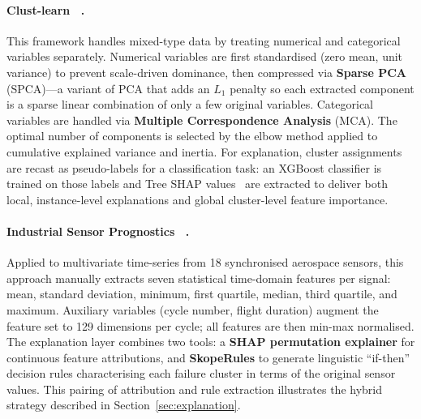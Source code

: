 \documentclass{article}
\theoremstyle{plain}
\theoremstyle{definition}
\theoremstyle{remark}
\begin{document}
\paragraph{Clust-learn ~\cite{alvarez-garcia_comprehensive_2024}.}
This framework handles mixed-type data by treating numerical and
categorical variables separately. Numerical variables are first
standardised (zero mean, unit variance) to prevent scale-driven
dominance, then compressed via \textbf{Sparse PCA} (SPCA)---a variant
of PCA that adds an $L_1$ penalty so each extracted component is a
sparse linear combination of only a few original variables. Categorical
variables are handled via \textbf{Multiple Correspondence Analysis}
(MCA). The optimal number of components is selected by the elbow method
applied to cumulative explained variance and inertia.
For explanation, cluster assignments are recast as pseudo-labels for a
classification task: an XGBoost classifier is trained on those labels and Tree SHAP values~\cite{lundberg_unified_2017, lundberg_local_2020} are extracted to deliver both local, instance-level explanations and global cluster-level feature importance.

\paragraph{Industrial Sensor Prognostics ~\cite{cohen_shapley-based_2024}.}
Applied to multivariate time-series from 18 synchronised aerospace
sensors, this approach manually extracts seven statistical time-domain
features per signal: mean, standard deviation, minimum, first quartile,
median, third quartile, and maximum. Auxiliary variables (cycle number,
flight duration) augment the feature set to 129 dimensions per cycle;
all features are then min-max normalised. The explanation layer combines
two tools: a \textbf{SHAP permutation explainer} for continuous feature
attributions, and \textbf{SkopeRules} to generate linguistic
``if-then'' decision rules characterising each failure cluster in terms
of the original sensor values. This pairing of attribution and rule
extraction illustrates the hybrid strategy described in
Section~\ref{sec:explanation}.
\end{document}
